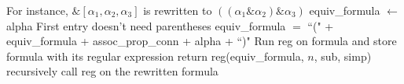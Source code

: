 \documentclass[runningheads]{llncs}
\begin{document}
\begin{algorithm}[H]
\begin{algorithmic}
        \Comment For instance, $\&[\alpha_1, \alpha_2, \alpha_3]$ is rewritten to $((\alpha_1 \& \alpha_2) \& \alpha_3)$
                \State equiv\_formula $\leftarrow$ alpha
                \Comment First entry doesn't need parentheses
            \Else
                \State equiv\_formula $=$ ``(" + equiv\_formula + assoc\_prop\_conn + alpha + ``)"
            \EndIf
        \EndFor
            \State Run reg on formula and store formula with its regular expression
        \EndIf
        \State return reg(equiv\_formula, $n$, sub, simp)
        \Comment recursively call reg on the rewritten formula
    \EndIf
\end{algorithmic}
\end{algorithm}
\end{document}
